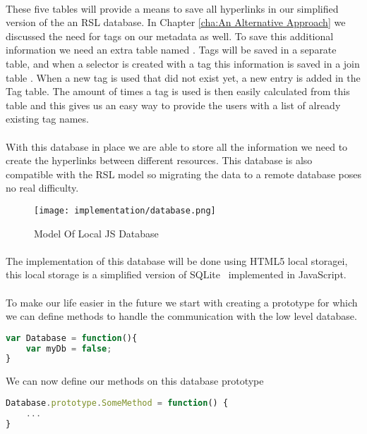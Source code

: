 	\paragraph{}
	These five tables will provide a means to save all hyperlinks in our simplified version of the an RSL database. In Chapter \ref{cha:An Alternative Approach} we discussed the need for tags on our metadata as well. To save this additional information we need an extra table named . Tags will be saved in a separate table, and when a selector is created with a tag this information is saved in a join table . When a new tag is used that did not exist yet, a new entry is added in the Tag table. The amount of times a tag is used is then easily calculated from this table and this gives us an easy way to provide the users with a list of already existing tag names.
	\paragraph{}
	With this database in place we are able to store all the information we need to create the hyperlinks between different resources. This database is also compatible with the RSL model so migrating the data to a remote database poses no real difficulty.
	\begin{figure}[h]
		\centering
		\texttt{[image: implementation/database.png]}
		\caption{Model Of Local JS Database}
	\end{figure}
	\paragraph{}
	The implementation of this database will be done using HTML5 local storagei, this local storage is a simplified version of SQLite~\cite{owens2006definitive} implemented in JavaScript.
	\paragraph{}
	To make our life easier in the future we start with creating a  prototype for which we can define methods to handle the communication with the low level database.
	\begin{lstlisting}[language=JavaScript]
var Database = function(){
	var myDb = false;
}
	\end{lstlisting}
	We can now define our methods on this database prototype
	\begin{lstlisting}[language=JavaScript]
Database.prototype.SomeMethod = function() {
	...
}
	\end{lstlisting}
